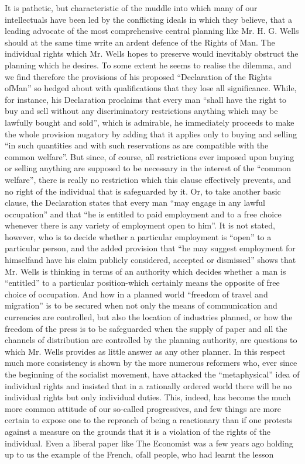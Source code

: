 \documentclass[11pt,openany]{book}
\begin{document}
It is pathetic, but characteristic of the muddle into which many of our intellectuals have been led by the conflicting ideals in which they believe, that a leading advocate of the most comprehensive central planning like Mr. H. G. Wells should at the same time write an ardent defence of the Rights of Man. The individual rights which Mr. Wells hopes to preserve would inevitably obstruct the planning which he desires. To some extent he seems to realise the dilemma, and we find therefore the provisions of his proposed ``Declaration of the Rights ofMan'' so hedged about with qualifications that they lose all significance. While, for instance, his Declaration proclaims that every man ``shall have the right to buy and sell without any discriminatory restrictions anything which may be lawfully bought and sold'', which is admirable, he immediately proceeds to make the whole provision nugatory by adding that it applies only to buying and selling ``in such quantities and with such reservations as are compatible with the common welfare''. But since, of course, all restrictions ever imposed upon buying or selling anything are supposed to be necessary in the interest of the ``common welfare'', there is really no restriction which this clause effectively prevents, and no right of the individual that is safeguarded by it. Or, to take another basic clause, the Declaration states that every man ``may engage in any lawful occupation'' and that ``he is entitled to paid employment and to a free choice whenever there is any variety of employment open to him''. It is not stated, however, who is to decide whether a particular employment is ``open'' to a particular person, and the added provision that ``he may suggest employment for himselfand have his claim publicly considered, accepted or dismissed'' shows that Mr. Wells is thinking in terms of an authority which decides whether a man is ``entitled'' to a particular position-which certainly means the opposite of free choice of occupation. And how in a planned world ``freedom of travel and migration'' is to be secured when not only the means of communication and currencies are controlled, but also the location of industries planned, or how the freedom of the press is to be safeguarded when the supply of paper and all the channels of distribution are controlled by the planning authority, are questions to which Mr. Wells provides as little answer as any other planner. In this respect much more consistency is shown by the more numerous reformers who, ever since the beginning of the socialist movement, have attacked the ``metaphysical'' idea of individual rights and insisted that in a rationally ordered world there will be no individual rights but only individual duties. This, indeed, has become the much more common attitude of our so-called progressives, and few things are more certain to expose one to the reproach of being a reactionary than if one protests against a measure on the grounds that it is a violation of the rights of the individual. Even a liberal paper like The Economist was a few years ago holding up to us the example of the French, ofall people, who had learnt the lesson
\end{document}
